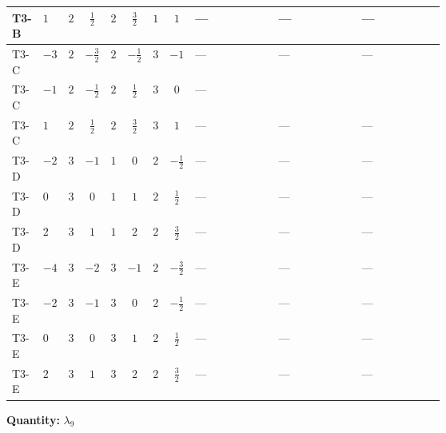 \documentclass[8pt]{article}
\begin{document}
\begin{landscape}
\begin{longtable}{@{}llcccccc >{\raggedright\arraybackslash}p{0.21\linewidth} >{\raggedright\arraybackslash}p{0.21\linewidth} >{\raggedright\arraybackslash}p{0.21\linewidth}@{}}
\midrule
T3-B & $1$ & $2$ & $\frac{1}{2}$ & $2$ & $\frac{3}{2}$ & $1$ & $1$ & --- & --- & --- \\
\midrule
T3-C & $-3$ & $2$ & $-\frac{3}{2}$ & $2$ & $-\frac{1}{2}$ & $3$ & $-1$ & --- & --- & --- \\
\midrule
T3-C & $-1$ & $2$ & $-\frac{1}{2}$ & $2$ & $\frac{1}{2}$ & $3$ & $0$ & --- & \scriptsize\adjustbox{max width=\linewidth}{$\begin{gathered} +\frac{5}{6} \operatorname{Tr}\!\left({y_2}\,\left({y_1}\right)^{\dagger}\,{y_2}\,\left({y_1}\right)^{\dagger}\right)\end{gathered}$} & \scriptsize\adjustbox{max width=\linewidth}{$\begin{gathered} +4 {\lambda_{7}} \left({\lambda_{8}}\right)^{*}\end{gathered}$} \\
\midrule
T3-C & $1$ & $2$ & $\frac{1}{2}$ & $2$ & $\frac{3}{2}$ & $3$ & $1$ & --- & --- & --- \\
\midrule
T3-D & $-2$ & $3$ & $-1$ & $1$ & $0$ & $2$ & $-\frac{1}{2}$ & --- & --- & --- \\
\midrule
T3-D & $0$ & $3$ & $0$ & $1$ & $1$ & $2$ & $\frac{1}{2}$ & --- & --- & --- \\
\midrule
T3-D & $2$ & $3$ & $1$ & $1$ & $2$ & $2$ & $\frac{3}{2}$ & --- & --- & --- \\
\midrule
T3-E & $-4$ & $3$ & $-2$ & $3$ & $-1$ & $2$ & $-\frac{3}{2}$ & --- & --- & --- \\
\midrule
T3-E & $-2$ & $3$ & $-1$ & $3$ & $0$ & $2$ & $-\frac{1}{2}$ & --- & --- & --- \\
\midrule
T3-E & $0$ & $3$ & $0$ & $3$ & $1$ & $2$ & $\frac{1}{2}$ & --- & --- & --- \\
\midrule
T3-E & $2$ & $3$ & $1$ & $3$ & $2$ & $2$ & $\frac{3}{2}$ & --- & --- & --- \\
\midrule
\bottomrule
\end{longtable}
\clearpage
\noindent\textbf{Quantity: }$\lambda_{9}$\par\smallskip

\end{landscape}
\end{document}
